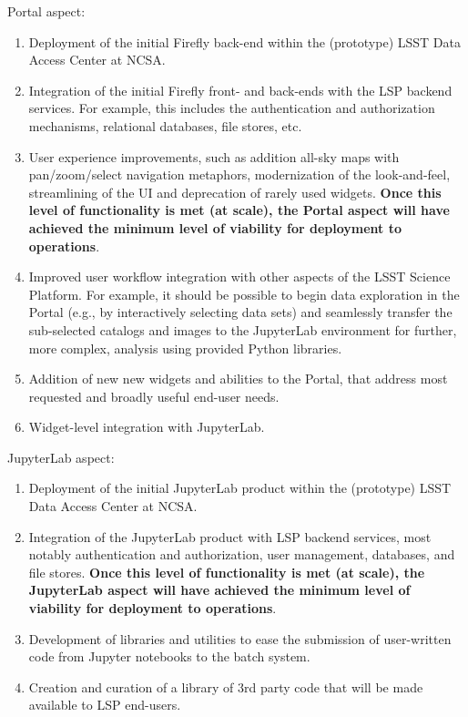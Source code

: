 \documentclass[DM,lsstdraft,toc]{lsstdoc}
\begin{document}
Portal aspect:
\begin{enumerate}
	\item Deployment of the initial Firefly back-end within the (prototype) LSST Data Access Center at NCSA.
	\item Integration of the initial Firefly front- and back-ends with the LSP backend services. For example, this includes the authentication and authorization mechanisms, relational databases, file stores, etc.
	\item User experience improvements, such as addition all-sky maps with pan/zoom/select navigation metaphors, modernization of the look-and-feel, streamlining of the UI and deprecation of rarely used widgets. {\bf Once this level of functionality is met (at scale), the Portal aspect will have achieved the minimum level of viability for deployment to operations}.
	\item Improved user workflow integration with other aspects of the LSST Science Platform. For example, it should be possible to begin data exploration in the Portal (e.g., by interactively selecting data sets) and seamlessly transfer the sub-selected catalogs and images to the JupyterLab environment for further, more complex, analysis using provided Python libraries.
	\item Addition of new new widgets and abilities to the Portal, that address most requested and broadly useful end-user needs.
	\item Widget-level integration with JupyterLab.
\end{enumerate}

JupyterLab aspect:
\begin{enumerate}
	\item Deployment of the initial JupyterLab product within the (prototype) LSST Data Access Center at NCSA.
	\item Integration of the JupyterLab product with LSP backend services, most notably authentication and authorization, user management, databases, and file stores. {\bf Once this level of functionality is met (at scale), the JupyterLab aspect will have achieved the minimum level of viability for deployment to operations}.
	\item Development of libraries and utilities to ease the submission of user-written code from Jupyter notebooks to the batch system.
	\item Creation and curation of a library of 3rd party code that will be made available to LSP end-users.
\end{enumerate}
\end{document}
